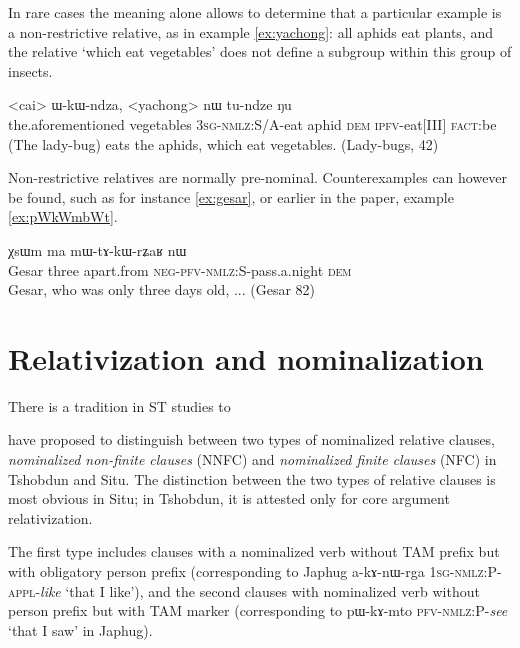 \documentclass[oldfontcommands,oneside,a4paper,11pt]{article}
\newcommand{\ipa}[1]{{\phon #1}} %
\newcommand{\topic}{\textsc{dem}}
\begin{document}
In rare cases the meaning alone allows to determine that a particular example  is a non-restrictive relative, as in example \ref{ex:yachong}: all aphids eat plants, and the relative `which eat vegetables' does not define a subgroup within this group of insects.

\begin{exe}
   \ex  \label{ex:yachong}
\gll \ipa{iɕqha}  	<cai>  	\ipa{ɯ-kɯ-ndza},  	<yachong>  	\ipa{nɯ}  	\ipa{tu-ndze}  	\ipa{ŋu}  \\
the.aforementioned vegetables \textsc{3sg-nmlz:}S/A-eat aphid \topic{} \textsc{ipfv}-eat[III] \textsc{fact}:be \\
\glt (The lady-bug) eats the aphids, which eat vegetables. (Lady-bugs, 42)
\end{exe}



Non-restrictive relatives are normally pre-nominal. Counterexamples can however be found, such as  for instance \ref{ex:gesar}, or earlier in the paper, example \ref{ex:pWkWmbWt}.
\begin{exe}
   \ex  \label{ex:gesar}
\gll  \ipa{ʁlaŋsaŋtɕhin}  	\ipa{χsɯm}  	\ipa{ma}  	\ipa{mɯ-tɤ-kɯ-rʑaʁ}  	\ipa{nɯ}     	\\
  Gesar three apart.from \textsc{neg-pfv-nmlz:S}-pass.a.night \topic{}   \\
 \glt  Gesar, who was only three days old, ... (Gesar 82)
   \end{exe} 



%


\section{Relativization and nominalization}
There is a tradition in ST studies to 
\citet{genetti08nmlz}
\citet{bickel99nmlz}

\citet{jacksonlin07} have proposed to distinguish between two types of nominalized relative clauses, \textit{nominalized non-finite clauses} (NNFC) and \textit{nominalized finite clauses} (NFC) in Tshobdun and Situ. The distinction between the two types of relative clauses is most obvious in Situ; in Tshobdun, it is attested only for core argument relativization.



The first type includes clauses with a nominalized verb without TAM prefix but with obligatory person prefix (corresponding to Japhug \ipa{a-kɤ-nɯ-rga} \textsc{1sg-nmlz:P-appl}-\textit{like} `that I like'), and the second clauses with nominalized verb without person prefix but with TAM marker (corresponding to \ipa{pɯ-kɤ-mto} \textsc{pfv-nmlz:}P-\textit{see} `that I saw' in Japhug). 
\end{document}
